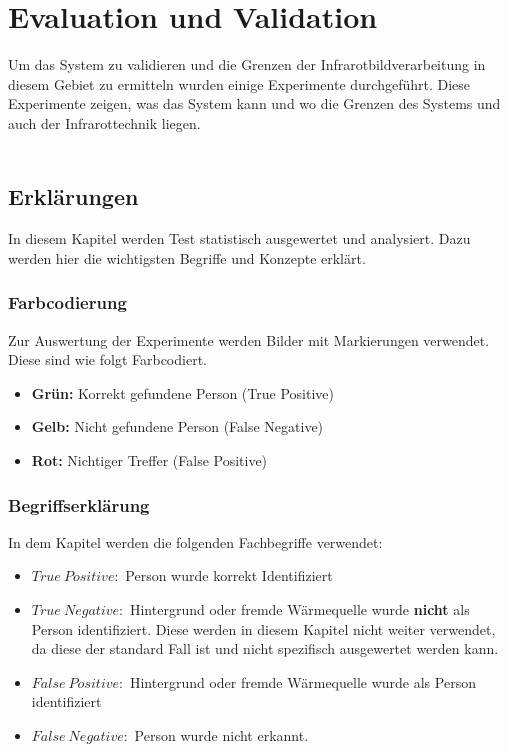 \chapter{Evaluation und Validation}
\label{ch:Eval}

Um das System zu validieren und die Grenzen der Infrarotbildverarbeitung in diesem Gebiet zu ermitteln wurden einige Experimente durchgeführt. Diese Experimente zeigen, was das System kann und wo die Grenzen des Systems und auch der Infrarottechnik liegen.\\
\\
\section{Erklärungen}
\label{sec:explanation}
In diesem Kapitel werden Test statistisch ausgewertet und analysiert. Dazu werden hier die wichtigsten Begriffe und Konzepte erklärt.

\subsection{Farbcodierung}
Zur Auswertung der Experimente werden Bilder mit Markierungen verwendet. Diese sind wie folgt Farbcodiert.\\

\begin{itemize}
	\item \textbf{Grün:} Korrekt gefundene Person (True Positive)
	\item \textbf{Gelb:} Nicht gefundene Person (False Negative)
	\item \textbf{Rot:} Nichtiger Treffer (False Positive)
\end{itemize}
\vspace{1em}

\subsection{Begriffserklärung}
\noindent In dem Kapitel werden die folgenden Fachbegriffe verwendet:
\begin{itemize}
	\item $True\: Positive:$   Person wurde korrekt Identifiziert
	\item $True\: Negative:$   Hintergrund oder fremde Wärmequelle wurde \textbf{nicht} als Person identifiziert. Diese werden in diesem Kapitel nicht weiter verwendet, da diese der standard Fall ist und nicht spezifisch ausgewertet werden kann.
	\item $False\: Positive:$  Hintergrund oder fremde Wärmequelle wurde als Person identifiziert
	\item $False\: Negative:$  Person wurde nicht erkannt.
\end{itemize}
\vspace{1em}

